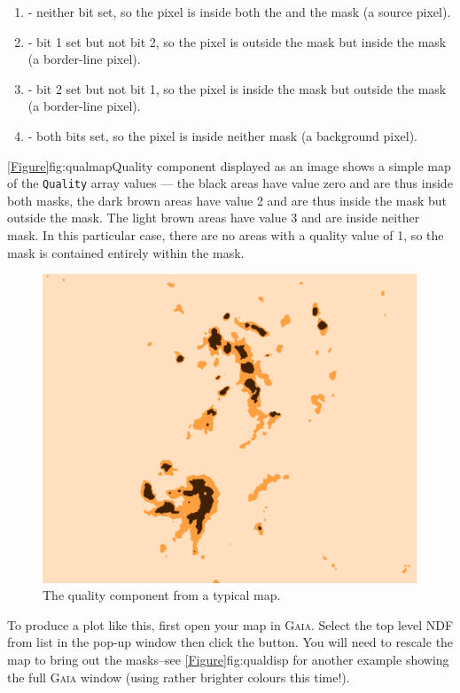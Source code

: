 \begin{enumerate}
\item - neither bit set, so the pixel is inside both the  and the  mask
(a source pixel).

\item - bit 1 set but not bit 2, so the pixel is outside the  mask but
inside the  mask (a border-line pixel).

\item - bit 2 set but not bit 1, so the pixel is inside the  mask but
outside the  mask (a border-line pixel).

\item - both bits set, so the pixel is inside neither mask (a background
pixel).
\end{enumerate}

\cref{Figure}{fig:qualmap}{Quality component displayed as an image} shows
a simple map of the \texttt{Quality} array values --- the black areas have
value zero and are thus inside both masks, the dark brown areas have value 2
and are thus inside the  mask but outside the  mask.
The light brown areas have value 3 and are inside neither mask. In this
particular case, there are no  areas with a quality value of 1, so the
 mask is contained entirely within the  mask.

\begin{figure}[t!]
\includegraphics[width=0.6\linewidth]{sc21_qual}
\caption[Quality component displayed as an image]{The quality component
from a typical map.}
\label{fig:qualmap}
\end{figure}

To produce a plot like this, first open your map in \textsc{Gaia}. Select
the top level NDF from list in the pop-up window then click the
 button. You will need to rescale the map to bring
out the masks--see \cref{Figure}{fig:qualdisp}{} for another example
showing the full \textsc{Gaia} window (using rather brighter colours this
time!).

